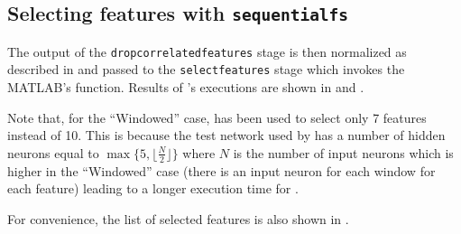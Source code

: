 \subsection{Selecting features with
\texttt{sequentialfs}}\label{subsec:sequentialfs}

The output of the \texttt{dropcorrelatedfeatures} stage is then normalized as
described in  and passed to the
\texttt{selectfeatures} stage which invokes the MATLAB's 
function. Results of 's executions are shown in
 and .

Note that, for the ``Windowed'' case,  has been used to
select only 7 features instead of 10. This is because the test network used by
 has a number of hidden neurons equal to \(\max
\{5,\lfloor\frac{N}{2}\rfloor\}\) where \(N\) is the number of input neurons
which is higher in the ``Windowed'' case (there is an input neuron for each
window for each feature) leading to a longer execution time for
.




For convenience, the list of selected features is also shown in
.

